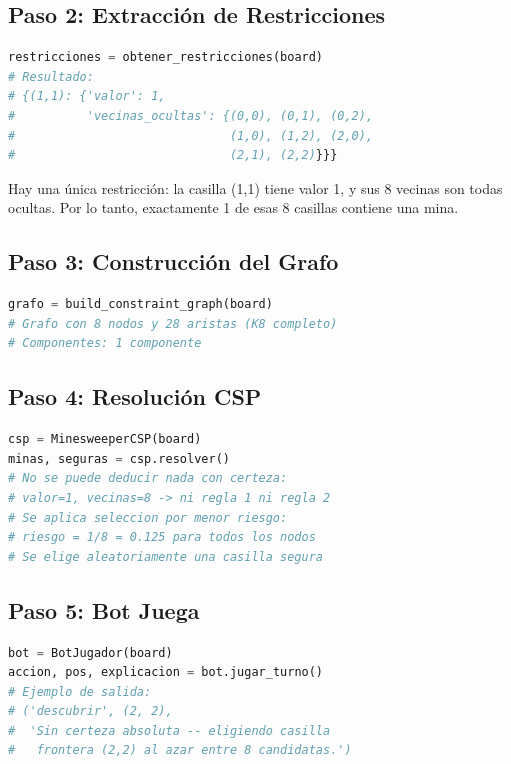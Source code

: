 \documentclass[12pt,a4paper]{article}
\begin{document}
\subsection{Paso 2: Extracción de Restricciones}

\begin{lstlisting}[language=Python]
restricciones = obtener_restricciones(board)
# Resultado:
# {(1,1): {'valor': 1,
#          'vecinas_ocultas': {(0,0), (0,1), (0,2),
#                              (1,0), (1,2), (2,0),
#                              (2,1), (2,2)}}}
\end{lstlisting}

Hay una única restricción: la casilla (1,1) tiene valor 1, y sus 8 vecinas son todas ocultas. Por lo tanto, exactamente 1 de esas 8 casillas contiene una mina.

\subsection{Paso 3: Construcción del Grafo}

\begin{lstlisting}[language=Python]
grafo = build_constraint_graph(board)
# Grafo con 8 nodos y 28 aristas (K8 completo)
# Componentes: 1 componente
\end{lstlisting}

\subsection{Paso 4: Resolución CSP}

\begin{lstlisting}[language=Python]
csp = MinesweeperCSP(board)
minas, seguras = csp.resolver()
# No se puede deducir nada con certeza:
# valor=1, vecinas=8 -> ni regla 1 ni regla 2
# Se aplica seleccion por menor riesgo:
# riesgo = 1/8 = 0.125 para todos los nodos
# Se elige aleatoriamente una casilla segura
\end{lstlisting}

\subsection{Paso 5: Bot Juega}

\begin{lstlisting}[language=Python]
bot = BotJugador(board)
accion, pos, explicacion = bot.jugar_turno()
# Ejemplo de salida:
# ('descubrir', (2, 2),
#  'Sin certeza absoluta -- eligiendo casilla
#   frontera (2,2) al azar entre 8 candidatas.')
\end{lstlisting}
\end{document}
